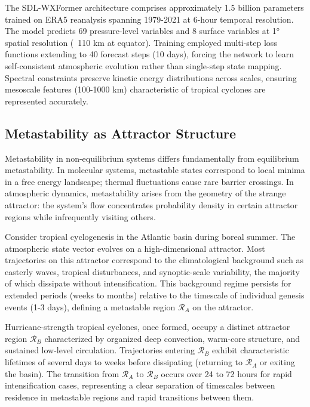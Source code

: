\documentclass[11pt]{article}
\begin{document}
The SDL-WXFormer architecture comprises approximately 1.5 billion parameters trained on ERA5 reanalysis spanning 1979-2021 at 6-hour temporal resolution. The model predicts 69 pressure-level variables and 8 surface variables at 1° spatial resolution (~110 km at equator). Training employed multi-step loss functions extending to 40 forecast steps (10 days), forcing the network to learn self-consistent atmospheric evolution rather than single-step state mapping. Spectral constraints preserve kinetic energy distributions across scales, ensuring mesoscale features (100-1000 km) characteristic of tropical cyclones are represented accurately.

\subsection{Metastability as Attractor Structure}

Metastability in non-equilibrium systems differs fundamentally from equilibrium metastability. In molecular systems, metastable states correspond to local minima in a free energy landscape; thermal fluctuations cause rare barrier crossings. In atmospheric dynamics, metastability arises from the geometry of the strange attractor: the system's flow concentrates probability density in certain attractor regions while infrequently visiting others.

Consider tropical cyclogenesis in the Atlantic basin during boreal summer. The atmospheric state vector evolves on a high-dimensional attractor. Most trajectories on this attractor correspond to the climatological background such as easterly waves, tropical disturbances, and synoptic-scale variability, the majority of which dissipate without intensification. This background regime persists for extended periods (weeks to months) relative to the timescale of individual genesis events (1-3 days), defining a metastable region $\mathcal{R}_A$ on the attractor.

Hurricane-strength tropical cyclones, once formed, occupy a distinct attractor region $\mathcal{R}_B$ characterized by organized deep convection, warm-core structure, and sustained low-level circulation. Trajectories entering $\mathcal{R}_B$ exhibit characteristic lifetimes of several days to weeks before dissipating (returning to $\mathcal{R}_A$ or exiting the basin). The transition from $\mathcal{R}_A$ to $\mathcal{R}_B$ occurs over 24 to 72 hours for rapid intensification cases, representing a clear separation of timescales between residence in metastable regions and rapid transitions between them.
\end{document}
